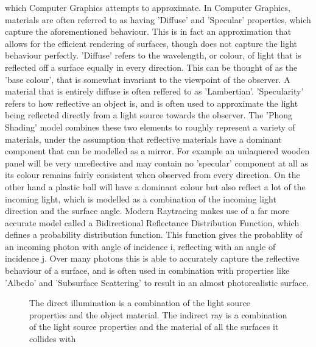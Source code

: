 \documentclass[ %
                    author={Gavin Parker},
                supervisor={Dr. Neill Campbell},
                    degree={MEng},
                     title={Deep Siamese Networks for Illumination Estimation from Stereo Images},
                  subtitle={},
                      type={research},
                      year={2018} ]{dissertation}
\begin{document}
which Computer Graphics attempts to approximate.
\newline
In Computer Graphics, materials are often referred to as having 'Diffuse' and 'Specular' properties, which capture the aforementioned behaviour. This is in fact an approximation that allows for the efficient rendering of surfaces, though does not capture the light behaviour perfectly. 'Diffuse' refers to the wavelength, or colour, of light that is reflected off a surface equally in every direction. This can be thought of as the 'base colour', that is somewhat invariant to the viewpoint of the observer. A material that is entirely diffuse is often reffered to as 'Lambertian'. 'Specularity' refers to how reflective an object is, and is often used to approximate the light being reflected directly from a light source towards the observer. The 'Phong Shading' model combines these two elements to roughly represent a variety of materials, under the assumption that reflective materials have a dominant component that can be modelled as a mirror. For example an unlaquered wooden panel will be very unreflective and may contain no 'specular' component at all as its colour remains fairly consistent when observed from every direction. On the other hand a plastic ball will have a dominant colour but also reflect a lot of the incoming light, which is modelled as a combination of the incoming light direction and the surface angle. Modern Raytracing makes use of a far more accurate model called a Bidirectional Reflectance Distribution Function, which defines a probability distribution function. This function gives the probablity of an incoming photon with angle of incidence i, reflecting with an angle of incidence j. Over many photons this is able to accurately capture the reflective behaviour of a surface, and is often used in combination with properties like 'Albedo' and 'Subsurface Scattering' to result in an almost photorealistic surface.
\begin{center}
\begin{figure}
\centering
{}
\label{raytracing}
\caption{The direct illumination is a combination of the light source properties and the object material. The indirect ray is a combination of the light source properties and the material of all the surfaces it collides with}
\end{figure}
\end{center}
\end{document}
